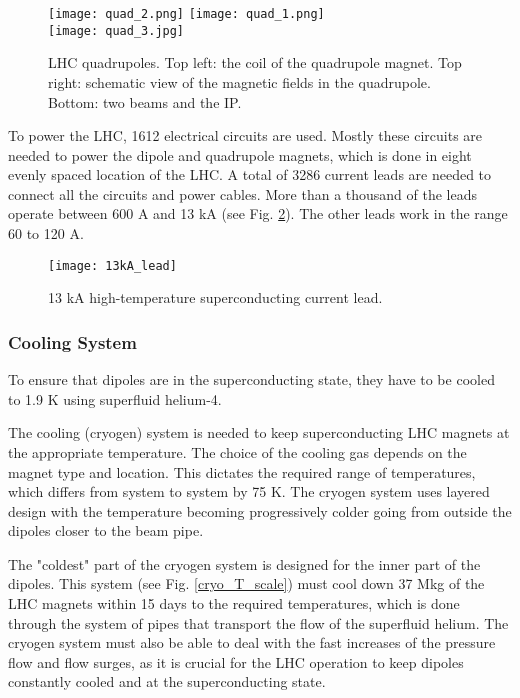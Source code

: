 \begin{figure}[H]
\centering
\texttt{[image: quad\_2.png]}
\texttt{[image: quad\_1.png]}\\
\vspace{0.5cm}
\texttt{[image: quad\_3.jpg]}
\caption[LHC quadrupoles]{LHC quadrupoles. Top left: the coil of the quadrupole magnet. Top right: schematic view of the magnetic fields in the quadrupole. Bottom: two beams and the IP.}
\label{quadrupoles}
\end{figure}


To power the LHC, 1612 electrical circuits are used. Mostly these circuits are needed to power the dipole and quadrupole magnets, which is done in eight evenly spaced location of the LHC. A total of 3286 current leads are needed to connect all the circuits and power cables. More than a thousand of the leads operate between 600 A and 13 kA (see Fig. \ref{13kA_lead}). The other leads work in the range 60 to 120 A. 

\begin{figure}[H]
  \centering
  \texttt{[image: 13kA\_lead]}
  \caption{13 kA high-temperature superconducting current lead.}\label{13kA_lead}
\end{figure}



\subsubsection{Cooling System}\label{sec:cryogenic}

To ensure that dipoles are in the superconducting state, they have to be cooled to 1.9 K using superfluid helium-4. 

The cooling (cryogen) system is needed to keep superconducting LHC magnets at the appropriate temperature. The choice of the cooling gas depends on the magnet type and location. This dictates the required range of temperatures, which differs from system to system by 75 K. The cryogen system uses layered design with the temperature becoming progressively colder going from outside the dipoles closer to the beam pipe. 

The "coldest" part of the cryogen system is designed for the inner part of the dipoles. This system (see Fig. \ref{cryo_T_scale}) must cool down 37 Mkg of the LHC magnets within 15 days to the required temperatures, which is done through the system of pipes that transport the flow of the superfluid helium. The cryogen system must also be able to deal with the fast increases of the pressure flow and flow surges, as it is crucial for the LHC operation to keep dipoles constantly cooled and at the superconducting state.


